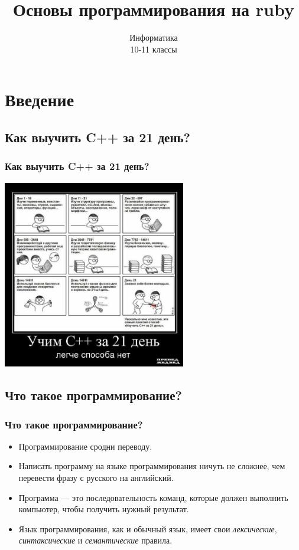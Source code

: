 \documentclass[compress,red]{beamer}
\title{Основы программирования на ruby}
\author{Информатика \\ 10-11 классы}
\begin{document}
\maketitle

\section{Введение}
\subsection{Как выучить C++ за 21 день?}
\begin{frame}
  \frametitle{Как выучить C++ за 21 день?}
	\centerline{\includegraphics[width=0.6\textwidth]{images/how_to_learn_c.jpg}}
\end{frame}

\subsection{Что такое программирование?}
\begin{frame}
  \frametitle{Что такое программирование?}
  \begin{itemize}
	\item Программирование сродни переводу.
	\item Написать программу на языке программирования ничуть не сложнее, чем перевести фразу с русского на английский.
	\item Программа --- это последовательность команд, которые должен выполнить компьютер, чтобы получить нужный результат.
	\item Язык программирования, как и обычный язык, имеет свои \emph{лексические}, \emph{синтаксические} и \emph{семантические} правила.
	\end{itemize}
\end{frame}
\end{document}
